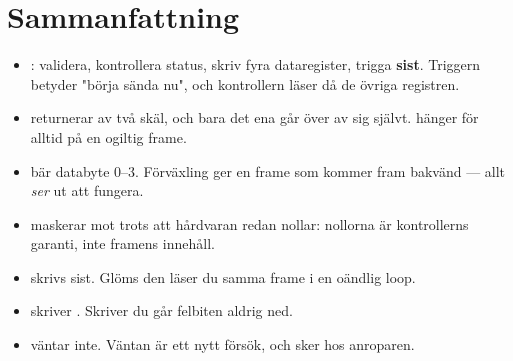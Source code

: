 \section*{Sammanfattning}

\begin{itemize}
  \item {}: validera, kontrollera status, skriv fyra dataregister, trigga \textbf{sist}.
    Triggern betyder "börja sända nu", och kontrollern läser då de övriga registren.
  \item {} returnerar  av två skäl, och bara det ena går över av sig självt.
     hänger för alltid på en ogiltig frame.
  \item {} bär databyte 0--3. Förväxling ger en frame som kommer fram bakvänd ---
    allt \emph{ser} ut att fungera.
  \item {} maskerar mot  trots att hårdvaran redan nollar: nollorna är
    kontrollerns garanti, inte framens innehåll.
  \item {} skrivs sist. Glöms den läser du samma frame i en oändlig loop.
  \item {} skriver . Skriver du  går felbiten aldrig ned.
  \item {} väntar inte. Väntan är ett nytt försök, och sker hos anroparen.
\end{itemize}
